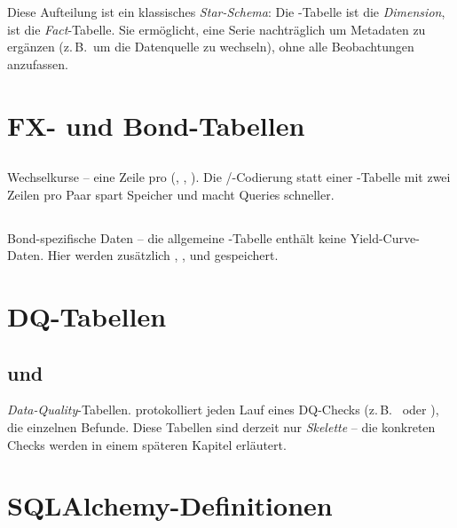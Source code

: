 Diese Aufteilung ist ein klassisches
\emph{Star-Schema}: Die -Tabelle ist die
\emph{Dimension},  ist die \emph{Fact}-Tabelle.
Sie ermöglicht, eine Serie nachträglich um Metadaten zu ergänzen
(z.\,B.\ um die Datenquelle zu wechseln), ohne alle Beobachtungen
anzufassen.

\section{FX- und Bond-Tabellen}

\subsection{}

Wechselkurse -- eine Zeile pro (, ,
). Die /-Codierung
statt einer -Tabelle mit zwei Zeilen pro Paar spart
Speicher und macht Queries schneller.

\subsection{}

Bond-spezifische Daten -- die allgemeine -Tabelle
enthält keine Yield-Curve-Daten. Hier werden zusätzlich
, ,  und 
gespeichert.

\section{DQ-Tabellen}

\subsection{ und }

\emph{Data-Quality}-Tabellen.  protokolliert jeden
Lauf eines DQ-Checks (z.\,B.\  oder
),  die einzelnen
Befunde. Diese Tabellen sind derzeit nur \emph{Skelette} -- die
konkreten Checks werden in einem späteren Kapitel erläutert.

\section{SQLAlchemy-Definitionen}

